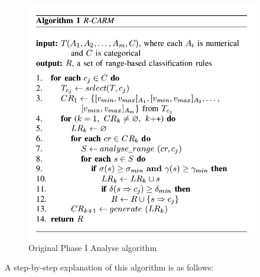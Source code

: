 \begin{figure}[h]
    \centering
    \includegraphics[width=4in]{figures/DrShaoAlgorithm1}
    \caption[Original Phase I Analyse algorithm]{Original Phase I Analyse algorithm}
    \label{fig:figure2_1}
\end{figure}

A step-by-step explanation of this algorithm is as follows: 


